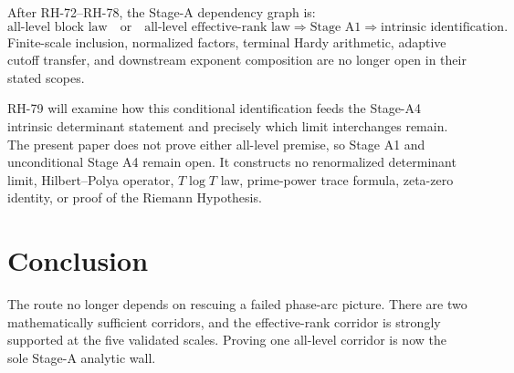 \documentclass[11pt]{article}
\begin{document}
After RH-72--RH-78, the Stage-A dependency graph is:
\[
 \boxed{\text{all-level block law}}
 \quad\text{or}\quad
 \boxed{\text{all-level effective-rank law}}
 \Longrightarrow
 \text{Stage A1}
 \Longrightarrow
 \text{intrinsic identification}.
\]
Finite-scale inclusion, normalized factors, terminal Hardy arithmetic,
adaptive cutoff transfer, and downstream exponent composition are no longer
open in their stated scopes.

RH-79 will examine how this conditional identification feeds the Stage-A4
intrinsic determinant statement and precisely which limit interchanges remain.
The present paper does not prove either all-level premise, so Stage A1 and
unconditional Stage A4 remain open.  It constructs no renormalized determinant
limit, Hilbert--Polya operator, $T\log T$ law, prime-power trace formula,
zeta-zero identity, or proof of the Riemann Hypothesis.

\section{Conclusion}

The route no longer depends on rescuing a failed phase-arc picture.  There are
two mathematically sufficient corridors, and the effective-rank corridor is
strongly supported at the five validated scales.  Proving one all-level
corridor is now the sole Stage-A analytic wall.



\end{document}
